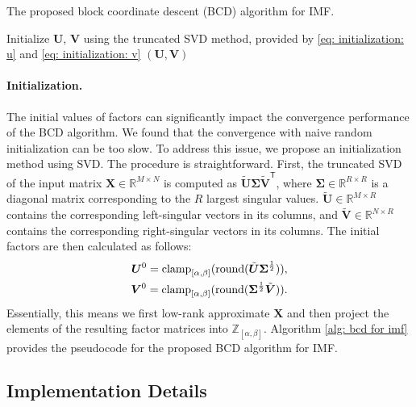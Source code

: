 \begin{algorithm}[!t]
	\caption{The proposed block coordinate descent (BCD) algorithm for IMF. \label{alg: bcd for imf}}
	\DontPrintSemicolon
	\SetAlgoLined
	Initialize $\bm{U}$, $\bm{V}$ using the truncated SVD method, provided by \eqref{eq: initialization: u} and \eqref{eq: initialization: v}\;
	\Return $(\bm{U}, \bm{V})$
\end{algorithm}

\paragraph{Initialization.}
The initial values of factors can significantly impact the convergence performance of the BCD algorithm. We found that the convergence with naive random initialization can be too slow. To address this issue, we propose an initialization method using SVD. The procedure is straightforward. First, the truncated SVD of the input matrix $\bm{X} \in \mathbb{R}^{M \times N}$ is computed as $\tilde{\bm{U}} \bm{\Sigma} \tilde{\bm{V}}^\mathsf{T}$, where $\bm{\Sigma} \in \mathbb{R}^{R \times R}$ is a diagonal matrix corresponding to the $R$ largest singular values. $\tilde{\bm{U}} \in \mathbb{R}^{M \times R}$ contains the corresponding left-singular vectors in its columns, and $\tilde{\bm{V}} \in \mathbb{R}^{N \times R}$ contains the corresponding right-singular vectors in its columns. The initial factors are then calculated as follows:
\begin{align} 
	\bm{U}^0 = \operatorname{clamp}_{[\alpha,\beta]}(\operatorname{round}(\tilde{\bm{U}} \bm{\Sigma}^\frac{1}{2})), \label{eq: initialization: u} \\
	\bm{V}^0 = \operatorname{clamp}_{[\alpha,\beta]}(\operatorname{round}(\bm{\Sigma}^\frac{1}{2} \tilde{\bm{V}})). \label{eq: initialization: v}
\end{align}
Essentially, this means we first low-rank approximate $\bm{X}$ and then project the elements of the resulting factor matrices into $\mathbb{Z}_{[\alpha,\beta]}$. Algorithm \ref{alg: bcd for imf} provides the pseudocode for the proposed BCD algorithm for IMF. 






\subsection{Implementation Details} \label{sec: implementation details}